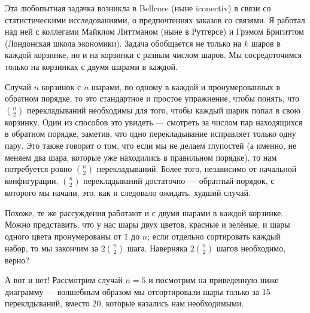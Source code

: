 Эта любопытная задачка возникла в Bellcore (ныне iconectiv) в связи со статистическими исследованиями, о предпочтениях заказов со связями.
Я работал над ней с коллегами Майклом Литтманом (ныне в Рутгерсе) и Грэмом Бригиттом (Лондонская школа экономики).
Задача обобщается не только на $k$ шаров в каждой корзинке, но и на корзинки с разным числом шаров.
Мы сосредоточимся только на корзинках с двумя шарами в каждой.

Случай $n$ корзинок с $n$ шарами, по одному в каждой и пронумерованных в обратном порядке, то это стандартное и простое упражнение, чтобы понять, что $\binom{n}{2}$ перекладываний необходимы для того, чтобы каждый шарик попал в свою корзинку.
Один из способов это увидеть --- смотреть за числом пар находящихся в обратном порядке, заметив, что одно перекладывание исправляет только одну пару.
Это также говорит о том, что если мы не делаем глупостей (а именно, не меняем два шара, которые уже находились в правильном порядке), то нам потребуется ровно $\binom{n}{2}$ перекладываний.
Более того, независимо от начальной конфигурации, $\binom{n}{2}$ перекладываний достаточно --- обратный порядок, с которого мы начали, это, как и следовало ожидать, худший случай.

Похоже, те же рассуждения работают и с двумя шарами в каждой корзинке.
Можно представить, что у нас шары двух цветов, красные и зелёные, и шары одного цвета пронумерованы от $1$ до $n$; 
если отдельно сортировать каждый набор, то мы закончим за $2\binom{n}{2}$ шага.
Наверняка $2\binom{n}{2}$ шагов необходимо, верно?

А вот и нет!
Рассмотрим случай $n = 5$ и посмотрим на приведенную ниже диаграмму --- волшебным образом мы отсортировали шары только за 15 переклдываний, вместо 20, которые казались нам необходимыми.

